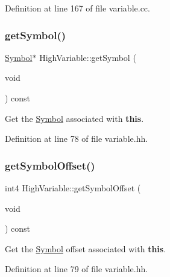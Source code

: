 Definition at line 167 of file variable.\+cc.

\mbox{\label{class_high_variable_abf6ee8ee41bc9ce3b953d70cee28a1e9}} 
\subsubsection{\texorpdfstring{getSymbol()}{getSymbol()}}
{\footnotesize\ttfamily \mbox{\hyperlink{class_symbol}{Symbol}}$\ast$ High\+Variable\+::get\+Symbol (\begin{DoxyParamCaption}\item[{void}]{ }\end{DoxyParamCaption}) const\hspace{0.3cm}{\ttfamily [inline]}}



Get the \mbox{\hyperlink{class_symbol}{Symbol}} associated with {\bfseries{this}}. 



Definition at line 78 of file variable.\+hh.

\mbox{\label{class_high_variable_ae0fb44bc258cdf238a7c8adc784274b8}} 
\subsubsection{\texorpdfstring{getSymbolOffset()}{getSymbolOffset()}}
{\footnotesize\ttfamily int4 High\+Variable\+::get\+Symbol\+Offset (\begin{DoxyParamCaption}\item[{void}]{ }\end{DoxyParamCaption}) const\hspace{0.3cm}{\ttfamily [inline]}}



Get the \mbox{\hyperlink{class_symbol}{Symbol}} offset associated with {\bfseries{this}}. 



Definition at line 79 of file variable.\+hh.

\mbox{\label{class_high_variable_a74c09ad2e70d4cc339af2526d529247a}} 
